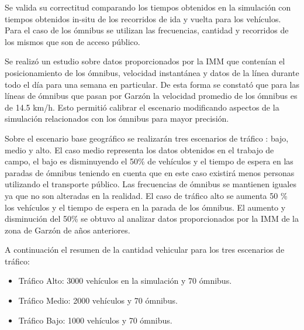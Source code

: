 Se valida su correctitud comparando los tiempos obtenidos en la simulación con tiempos obtenidos in-situ de los recorridos de ida y vuelta para los vehículos. Para el caso de los ómnibus se utilizan las frecuencias, cantidad y recorridos de los mismos que son de acceso público.

Se realizó un estudio sobre datos proporcionados por la IMM que contenían el posicionamiento de los ómnibus, velocidad instantánea y datos de la línea durante todo el día para una semana en particular. De esta forma se constató que para las líneas de ómnibus que pasan por Garzón la velocidad promedio de los ómnibus es de 14.5 km/h. Esto permitió calibrar el escenario modificando aspectos de la simulación relacionados con los ómnibus para mayor precisión.

Sobre el escenario base geográfico se realizarán tres escenarios de tráfico : bajo, medio y alto.
El caso medio representa los datos obtenidos en el trabajo de campo, el bajo es disminuyendo el 50\% de vehículos y el tiempo de espera en las paradas de ómnibus teniendo en cuenta que en este caso existirá menos personas utilizando el transporte público. Las frecuencias de ómnibus se mantienen iguales ya que no son alteradas en la realidad.
El caso de tráfico alto se aumenta 50 \%  los vehículos y el tiempo de espera en la parada de los ómnibus. El aumento y disminución del 50\% se obtuvo al analizar datos proporcionados por la IMM de la zona de Garzón de años anteriores. \newline

A continuación el resumen de la cantidad vehicular para los tres escenarios de tráfico:

\begin{itemize}
\item Tráfico Alto:  3000 vehículos en la simulación y 70 ómnibus. 
\item Tráfico Medio: 2000 vehículos y 70 ómnibus.
\item Tráfico Bajo:  1000 vehículos y 70 ómnibus.
\end{itemize}

 


